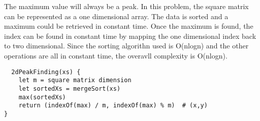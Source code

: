The maximum value will always be a peak. In this problem, the square matrix can be represented as a one dimensional array. The data is sorted and a maximum could be retrieved in constant time. Once the maximum is found, the index can be found in constant time by mapping the one dimensional index back to two dimensional. Since the sorting algorithn used is O(nlogn) and the other operations are all in constant time, the overavll complexity is O(nlogn).

\begin{verbatim}
  2dPeakFinding(xs) {
    let m = square matrix dimension
    let sortedXs = mergeSort(xs)
    max(sortedXs)
    return (indexOf(max) / m, indexOf(max) % m)  # (x,y)
}
\end{verbatim}
